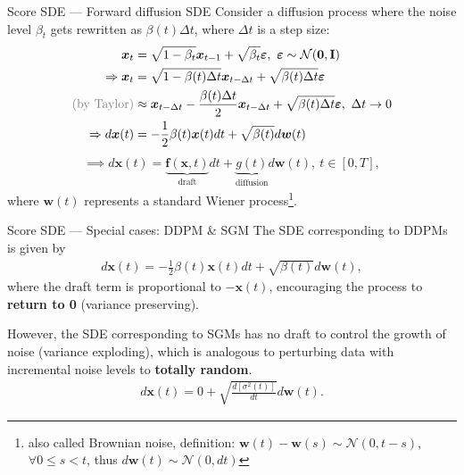 \documentclass[10pt]{beamer}
\begin{document}
\begin{frame}{Score SDE --- \normalsize Forward diffusion SDE}
    Consider a diffusion process where the noise level $\beta_t$ gets rewritten as $\beta(t)\Delta t$, 
    where $\Delta t$ is a step size:
    \begin{align*}
        \bm{x}_t & = \sqrt{1-\beta_t}\bm{x}_{t-1} + \sqrt{\beta_t}\bm{\varepsilon},~ \bm{\varepsilon}\sim\mathcal{N}(\bm{0},\mathbf{I}) \\
        \implies \bm{x}_t & = \sqrt{1-\beta(t)\Delta t}\bm{x}_{t-\Delta t} + \sqrt{\beta(t)\Delta t}\bm{\varepsilon} \\
       \textcolor{gray}{\text{(by Taylor)}} & \approx \bm{x}_{t-\Delta t} - \frac{\beta(t)\Delta t}{2}\bm{x}_{t-\Delta t} + \sqrt{\beta(t)\Delta t}\bm{\varepsilon},~\Delta t \to 0 \\
       \implies {d\bm{x}(t)} & = -\frac{1}{2}\beta(t)\bm{x}(t)dt + \sqrt{\beta(t)}d\bm{w}(t)
       \end{align*}
       \begin{gather}
        \implies d\bm{x}(t) = \underbrace{\bm{f}(\bm{x},t)}_\text{draft}dt + \underbrace{g(t)}_\text{diffusion}d\bm{w}(t),~t\in[0,T], \label{eq:diffusionsde}
    \end{gather}
    where $\bm{w}(t)$ represents a standard Wiener process\footnote{also called Brownian noise, definition: $\bm{w}(t)-\bm{w}(s)\sim\mathcal{N}(0, t-s)$, $\forall{0\leq s < t}$, thus $d\bm{w}(t)\sim \mathcal{N}(0,dt)$}.
\end{frame}

\begin{frame}{Score SDE --- \normalsize Special cases: DDPM \& SGM}
    The SDE corresponding to DDPMs is given by
    \begin{gather*}
        d\bm{x}(t) = -\frac{1}{2}\beta(t)\bm{x}(t)dt + \sqrt{\beta(t)}d\bm{w}(t),
    \end{gather*}
    where the draft term is proportional to $-\bm{x}(t)$, encouraging the process to \textbf{return to 0} (variance preserving). 
    
    \bigskip
    
    However, the SDE corresponding to SGMs has no draft to control the growth of noise (variance exploding), which is analogous to perturbing data with incremental noise levels to \textbf{totally random}.
    \begin{gather*}
        d\bm{x}(t) = 0 + \sqrt{\frac{d[\sigma^2(t)]}{dt}}d\bm{w}(t).
    \end{gather*}
\end{frame}
\end{document}
